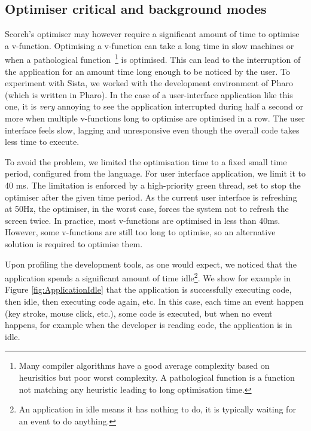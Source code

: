 \documentclass[a4paper,12pt,twoside]{../includes/ThesisStyle}
\begin{document}
\subsection{Optimiser critical and background modes}
\label{sec:optModes}

Scorch's optimiser may however require a significant amount of time to optimise a v-function. Optimising a v-function can take a long time in slow machines or when a pathological function~\footnote{Many compiler algorithms have a good average complexity based on heurisitics but poor worst complexity. A pathological function is a function not matching any heuristic leading to long optimisation time.} is optimised. This can lead to the interruption of the application for an amount time long enough to be noticed by the user. To experiment with Sista, we worked with the development environment of Pharo (which is written in Pharo). In the case of a user-interface application like this one, it is \emph{very} annoying to see the application interrupted during half a second or more when multiple v-functions long to optimise are optimised in a row. The user interface feels slow, lagging and unresponsive even though the overall code takes less time to execute.

To avoid the problem, we limited the optimisation time to a fixed small time period, configured from the language. For user interface application, we limit it to 40 ms. The limitation is enforced by a high-priority green thread, set to stop the optimiser after the given time period. As the current user interface is refreshing at 50Hz, the optimiser, in the worst case, forces the system not to refresh the screen twice. In practice, most v-functions are optimised in less than 40ms. However, some v-functions are still too long to optimise, so an alternative solution is required to optimise them.

Upon profiling the development tools, as one would expect, we noticed that the application spends a significant amount of time idle\footnote{An application in idle means it has nothing to do, it is typically waiting for an event to do anything.}. We show for example in Figure \ref{fig:ApplicationIdle} that the application is successfully executing code, then idle, then executing code again, etc. In this case, each time an event happen (key stroke, mouse click, etc.), some code is executed, but when no event happens, for example when the developer is reading code, the application is in idle.
\end{document}
